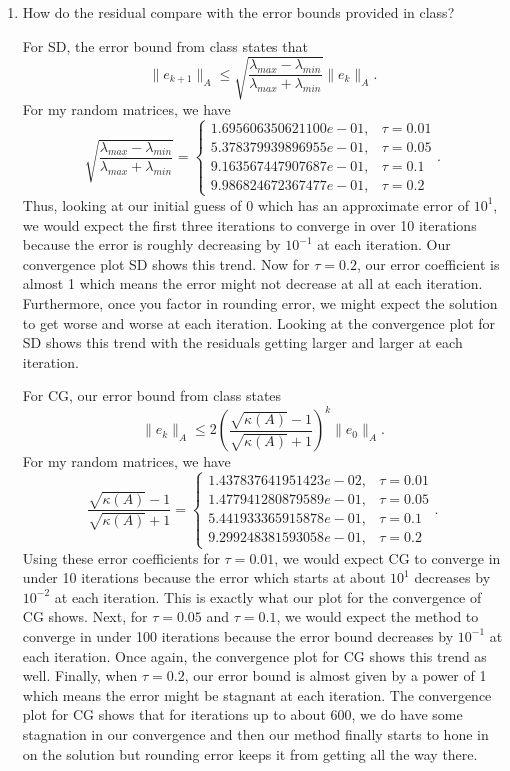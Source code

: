 \documentclass[a4paper,12pt]{article}
\newcommand{\norm}[1]{\lVert #1 \rVert}
\begin{document}
\begin{enumerate}[label = \arabic*)]
\begin{enumerate}[label = (\alph*)]
		\item How do the residual compare with the error bounds provided in class?
		
		For SD, the error bound from class states that
		\[
			\norm{e_{k+1}}_A \leq \sqrt{\frac{\lambda_{max} - \lambda_{min}}{\lambda_{max} + \lambda_{min}}} \norm{e_k}_A.
		\]
		For my random matrices, we have
		\[
			\sqrt{\frac{\lambda_{max} - \lambda_{min}}{\lambda_{max} + \lambda_{min}}} = \begin{cases}
				1.695606350621100e-01, & \tau = 0.01 \\
				5.378379939896955e-01, & \tau = 0.05 \\
				9.163567447907687e-01, & \tau = 0.1    \\
				9.986824672367477e-01, & \tau = 0.2
			\end{cases}.
		\]
		Thus, looking at our initial guess of $ 0 $ which has an approximate error of $ 10^1 $, we would expect the first three iterations to converge in over 10 iterations because the error is roughly decreasing by $ 10^{-1} $ at each iteration. Our convergence plot SD shows this trend. Now for $ \tau = 0.2 $, our error coefficient is almost 1 which means the error might not decrease at all at each iteration. Furthermore, once you factor in rounding error, we might expect the solution to get worse and worse at each iteration. Looking at the convergence plot for SD shows this trend with the residuals getting larger and larger at each iteration.
		
		For CG, our error bound from class states
		\[
			\norm{e_{k}}_A \leq 2 \left(\frac{\sqrt{\kappa(A)} - 1}{\sqrt{\kappa(A)} + 1}\right)^k \norm{e_0}_A.
		\]
		For my random matrices, we have
		\[
			\frac{\sqrt{\kappa(A)} - 1}{\sqrt{\kappa(A)} + 1} = \begin{cases}
				1.437837641951423e-02, & \tau = 0.01 \\
				1.477941280879589e-01, & \tau = 0.05 \\
				5.441933365915878e-01, & \tau = 0.1   \\
				9.299248381593058e-01, & \tau = 0.2
			\end{cases}.
		\]
		Using these error coefficients for $ \tau = 0.01$, we would expect CG to converge in under 10 iterations because the error which starts at about $ 10^1 $ decreases by $ 10^{-2} $ at each iteration. This is exactly what our plot for the convergence of CG shows. Next, for $ \tau = 0.05 $ and $ \tau = 0.1 $, we would expect the method to converge in under 100 iterations because the error bound decreases by $ 10^{-1} $ at each iteration. Once again, the convergence plot for CG shows this trend as well. Finally, when $ \tau = 0.2 $, our error bound is almost given by a power of 1 which means the error might be stagnant at each iteration. The convergence plot for CG shows that for iterations up to about 600, we do have some stagnation in our convergence and then our method finally starts to hone in on the solution but rounding error keeps it from getting all the way there. 
		

\end{enumerate}
\end{enumerate}
\end{document}
